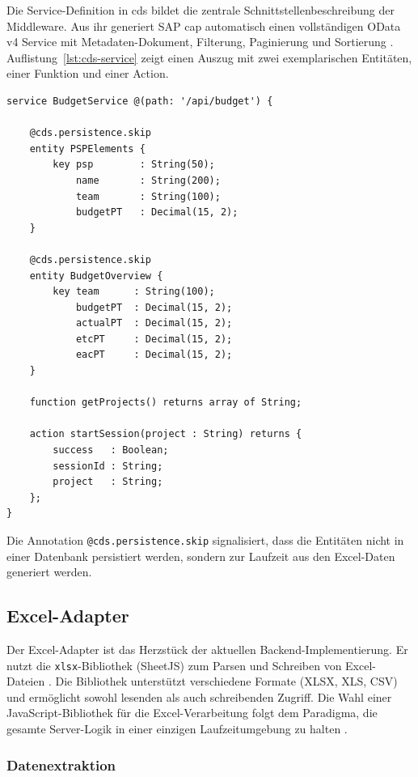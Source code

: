 Die Service-Definition in \gls{cds} bildet die zentrale Schnittstellenbeschreibung der Middleware. Aus ihr generiert SAP \gls{cap} automatisch einen vollständigen OData v4 Service mit Metadaten-Dokument, Filterung, Paginierung und Sortierung \citep{sap2024cap}. Auflistung~\ref{lst:cds-service} zeigt einen Auszug mit zwei exemplarischen Entitäten, einer Funktion und einer Action.

\begin{lstlisting}[caption={Auszug aus budget-service.cds}, label={lst:cds-service}]
service BudgetService @(path: '/api/budget') {

    @cds.persistence.skip
    entity PSPElements {
        key psp        : String(50);
            name       : String(200);
            team       : String(100);
            budgetPT   : Decimal(15, 2);
    }

    @cds.persistence.skip
    entity BudgetOverview {
        key team      : String(100);
            budgetPT  : Decimal(15, 2);
            actualPT  : Decimal(15, 2);
            etcPT     : Decimal(15, 2);
            eacPT     : Decimal(15, 2);
    }

    function getProjects() returns array of String;

    action startSession(project : String) returns {
        success   : Boolean;
        sessionId : String;
        project   : String;
    };
}
\end{lstlisting}

Die Annotation \texttt{@cds.persistence.skip} signalisiert, dass die Entitäten nicht in einer Datenbank persistiert werden, sondern zur Laufzeit aus den Excel-Daten generiert werden.

\subsection{Excel-Adapter}

Der Excel-Adapter ist das Herzstück der aktuellen Backend-Implementierung. Er nutzt die \texttt{xlsx}-Bibliothek (SheetJS) zum Parsen und Schreiben von Excel-Dateien \citep{sheetjs2024}. Die Bibliothek unterstützt verschiedene Formate (XLSX, XLS, CSV) und ermöglicht sowohl lesenden als auch schreibenden Zugriff. Die Wahl einer JavaScript-Bibliothek für die Excel-Verarbeitung folgt dem Paradigma, die gesamte Server-Logik in einer einzigen Laufzeitumgebung zu halten \citep{nodejs2024}.

\subsubsection{Datenextraktion}


